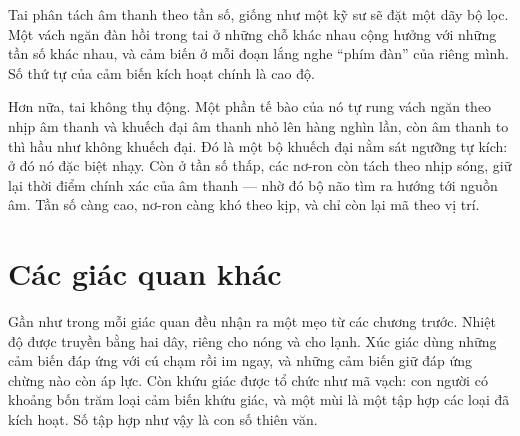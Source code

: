 Tai phân tách âm thanh theo tần số, giống như một kỹ sư sẽ đặt một dãy bộ lọc. Một vách ngăn đàn hồi trong tai ở những chỗ khác nhau cộng hưởng với những tần số khác nhau, và cảm biến ở mỗi đoạn lắng nghe ``phím đàn'' của riêng mình. Số thứ tự của cảm biến kích hoạt chính là cao độ.


Hơn nữa, tai không thụ động. Một phần tế bào của nó tự rung vách ngăn theo nhịp âm thanh và khuếch đại âm thanh nhỏ lên hàng nghìn lần, còn âm thanh to thì hầu như không khuếch đại. Đó là một bộ khuếch đại nằm sát ngưỡng tự kích: ở đó nó đặc biệt nhạy. Còn ở tần số thấp, các nơ-ron còn tách theo nhịp sóng, giữ lại thời điểm chính xác của âm thanh --- nhờ đó bộ não tìm ra hướng tới nguồn âm. Tần số càng cao, nơ-ron càng khó theo kịp, và chỉ còn lại mã theo vị trí.

\section*{Các giác quan khác}

Gần như trong mỗi giác quan đều nhận ra một mẹo từ các chương trước. Nhiệt độ được truyền bằng hai dây, riêng cho nóng và cho lạnh. Xúc giác dùng những cảm biến đáp ứng với cú chạm rồi im ngay, và những cảm biến giữ đáp ứng chừng nào còn áp lực. Còn khứu giác được tổ chức như mã vạch: con người có khoảng bốn trăm loại cảm biến khứu giác, và một mùi là một tập hợp các loại đã kích hoạt. Số tập hợp như vậy là con số thiên văn.

